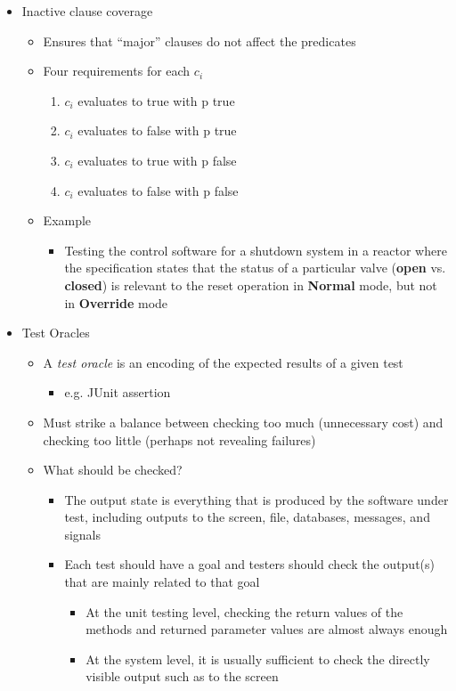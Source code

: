 \begin{itemize}
\begin{itemize}
	\end{itemize}

	\item Inactive clause coverage
	\begin{itemize}
		\item Ensures that “major” clauses do not affect the predicates
		\item Four requirements for each $ c_i $
		\begin{enumerate}
			\item $c_i$ evaluates to true with p true
			\item $c_i$ evaluates to false with p true
			\item $c_i$ evaluates to true with p false
			\item $c_i$ evaluates to false with p false
		\end{enumerate}
		\item Example
		\begin{itemize}
			\item Testing the control software for a shutdown system in a reactor where the specification states that the status of a particular valve (\textbf{open} vs. \textbf{closed}) is relevant to the reset operation in \textbf{Normal} mode, but not in \textbf{Override} mode
		\end{itemize}
	\end{itemize}

	\item Test Oracles
	\begin{itemize}
		\item A \textit{test oracle} is an encoding of the expected results of a given test
		\begin{itemize}
			\item e.g. JUnit assertion
		\end{itemize}
		\item Must strike a balance between checking too much (unnecessary cost) and checking too little (perhaps not revealing failures)
		\item What should be checked?
		\begin{itemize}
			\item The output state is everything that is produced by the software under test, including outputs to the screen, file, databases, messages, and signals
			\item Each test should have a goal and testers should check the output(s) that are mainly related to that goal
			\begin{itemize}
				\item At the unit testing level, checking the return values of the methods and returned parameter values are almost always enough
				\item At the system level, it is usually sufficient to check the directly visible output such as to the screen
			\end{itemize}
		\end{itemize}


\end{itemize}
\end{itemize}
